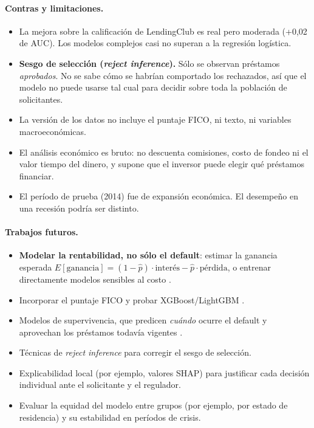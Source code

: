 \documentclass{article}
\begin{document}
\paragraph{Contras y limitaciones.}
\begin{itemize}
  \item La mejora sobre la calificación de LendingClub es real pero moderada
        (+0,02 de AUC). Los modelos complejos casi no superan a la regresión
        logística.
  \item \textbf{Sesgo de selección (\emph{reject inference}).} Sólo se observan
        préstamos \emph{aprobados}. No se sabe cómo se habrían comportado los
        rechazados, así que el modelo no puede usarse tal cual para decidir sobre
        toda la población de solicitantes.
  \item La versión de los datos no incluye el puntaje FICO, ni texto, ni
        variables macroeconómicas.
  \item El análisis económico es bruto: no descuenta comisiones, costo de fondeo
        ni el valor tiempo del dinero, y supone que el inversor puede elegir
        qué préstamos financiar.
  \item El período de prueba (2014) fue de expansión económica. El desempeño en
        una recesión podría ser distinto.
\end{itemize}

\paragraph{Trabajos futuros.}
\begin{itemize}
  \item \textbf{Modelar la rentabilidad, no sólo el default}: estimar la ganancia
        esperada $E[\text{ganancia}] = (1-\hat p)\cdot\text{interés} -
        \hat p \cdot \text{pérdida}$, o entrenar directamente modelos sensibles
        al costo \cite{xia2017}.
  \item Incorporar el puntaje FICO y probar XGBoost/LightGBM \cite{ma2018}.
  \item Modelos de supervivencia, que predicen \emph{cuándo} ocurre el default y
        aprovechan los préstamos todavía vigentes \cite{emekter2015}.
  \item Técnicas de \emph{reject inference} para corregir el sesgo de selección.
  \item Explicabilidad local (por ejemplo, valores SHAP) para justificar cada
        decisión individual ante el solicitante y el regulador.
  \item Evaluar la equidad del modelo entre grupos (por ejemplo, por estado de
        residencia) y su estabilidad en períodos de crisis.
\end{itemize}
\end{document}
